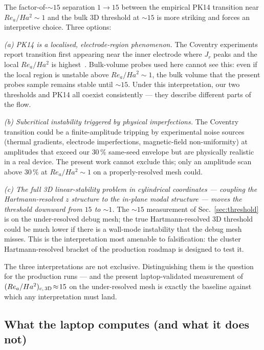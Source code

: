 \documentclass[aps,prl,twocolumn,superscriptaddress]{revtex4-2}
\begin{document}
The factor-of-$\sim\!15$ separation $1\to 15$ between the empirical
PK14 transition near $Re_a/Ha^{2}\!\sim\!1$ and the bulk 3D
threshold at $\sim\!15$ is more striking and forces an interpretive
choice.  Three options:

\textit{(a) PK14 is a localised, electrode-region phenomenon.}  The
Coventry experiments report transition first appearing near the
inner electrode where $J_r$ peaks and the local $Re_a/Ha^{2}$ is
highest~\cite{2}.  Bulk-volume probes used here cannot see this:
even if the local region is unstable above $Re_a/Ha^{2}\!\sim\!1$,
the bulk volume that the present probes sample remains stable until
$\sim\!15$.  Under this interpretation, our two thresholds and PK14
all coexist consistently --- they describe different parts of the
flow.

\textit{(b) Subcritical instability triggered by physical
imperfections.}  The Coventry transition could be a finite-amplitude
tripping by experimental noise sources (thermal gradients, electrode
imperfections, magnetic-field non-uniformity) at amplitudes that
exceed our $30\,\%$ same-seed envelope but are physically realistic
in a real device.  The present work cannot exclude this; only an
amplitude scan above $30\,\%$ at $Re_a/Ha^{2}\!\sim\!1$ on a
properly-resolved mesh could.

\textit{(c) The full 3D linear-stability problem in cylindrical
coordinates --- coupling the Hartmann-resolved $z$ structure to the
in-plane modal structure --- moves the threshold downward from $15$
to $\sim\!1$.}  The $\sim\!15$ measurement of
Sec.~\ref{sec:threshold} is on the under-resolved debug mesh; the
true Hartmann-resolved 3D threshold could be much lower if there is
a wall-mode instability that the debug mesh misses.  This is the
interpretation most amenable to falsification: the cluster
Hartmann-resolved bracket of the production roadmap is designed to
test it.

The three interpretations are not exclusive.  Distinguishing them is
the question for the production runs --- and the present
laptop-validated measurement of
$(Re_a/Ha^{2})_{c,\,\rm 3D}\!\approx\!15$ on the under-resolved
mesh is exactly the baseline against which any interpretation must
land.

\subsection{What the laptop computes (and what it does not)}
\label{sec:disc_scope}
\end{document}

